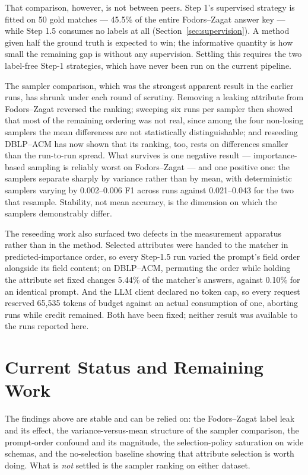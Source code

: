\documentclass[11pt]{article}
\begin{document}
That comparison, however, is not between peers. Step 1's supervised strategy is fitted
on 50 gold matches --- 45.5\% of the entire Fodors--Zagat answer key --- while Step 1.5
consumes no labels at all (Section~\ref{sec:supervision}). A method given half the
ground truth is expected to win; the informative quantity is how small the remaining
gap is without any supervision. Settling this requires the two label-free Step-1
strategies, which have never been run on the current pipeline.

The sampler comparison, which was the strongest apparent result in the earlier runs,
has shrunk under each round of scrutiny. Removing a leaking attribute from
Fodors--Zagat reversed the ranking; sweeping six runs per sampler then showed that
most of the remaining ordering was not real, since among the four non-losing samplers
the mean differences are not statistically distinguishable; and reseeding DBLP--ACM
has now shown that its ranking, too, rests on differences smaller than the run-to-run
spread. What survives is one negative result --- importance-based sampling is
reliably worst on Fodors--Zagat --- and one positive one: the samplers separate
sharply by variance rather than by mean, with deterministic samplers varying by
0.002--0.006 F1 across runs against 0.021--0.043 for the two that resample. Stability,
not mean accuracy, is the dimension on which the samplers demonstrably differ.

The reseeding work also surfaced two defects in the measurement apparatus rather than
in the method. Selected attributes were handed to the matcher in predicted-importance
order, so every Step-1.5 run varied the prompt's field order alongside its field
content; on DBLP--ACM, permuting the order while holding the attribute set fixed
changes 5.44\% of the matcher's answers, against 0.10\% for an identical prompt. And
the LLM client declared no token cap, so every request reserved 65{,}535 tokens of
budget against an actual consumption of one, aborting runs while credit remained. Both
have been fixed; neither result was available to the runs reported here.

\section{Current Status and Remaining Work}
\label{sec:status}

The findings above are stable and can be relied on: the Fodors--Zagat label leak and
its effect, the variance-versus-mean structure of the sampler comparison, the
prompt-order confound and its magnitude, the selection-policy saturation on wide
schemas, and the no-selection baseline showing that attribute selection is worth
doing. What is \emph{not} settled is the sampler ranking on either dataset.
\end{document}
